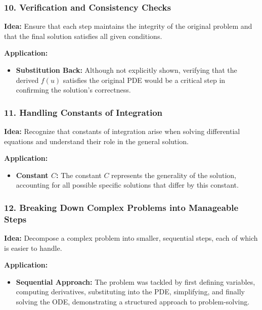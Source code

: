 \documentclass[a4paper,12pt]{book}
\begin{document}
\subsubsection{10. Verification and Consistency Checks}

\textbf{Idea:} Ensure that each step maintains the integrity of the original problem and that the final solution satisfies all given conditions.

\textbf{Application:}
\begin{itemize}
\item 
\textbf{Substitution Back:} Although not explicitly shown, verifying that the derived \( f(u) \) satisfies the original PDE would be a critical step in confirming the solution's correctness.

\end{itemize}

\subsubsection{11. Handling Constants of Integration}

\textbf{Idea:} Recognize that constants of integration arise when solving differential equations and understand their role in the general solution.

\textbf{Application:}
\begin{itemize}
\item 
\textbf{Constant \( C \):} The constant \( C \) represents the generality of the solution, accounting for all possible specific solutions that differ by this constant.

\end{itemize}

\subsubsection{12. Breaking Down Complex Problems into Manageable Steps}

\textbf{Idea:} Decompose a complex problem into smaller, sequential steps, each of which is easier to handle.

\textbf{Application:}
\begin{itemize}
\item 
\textbf{Sequential Approach:} The problem was tackled by first defining variables, computing derivatives, substituting into the PDE, simplifying, and finally solving the ODE, demonstrating a structured approach to problem-solving.

\end{itemize}
\end{document}
